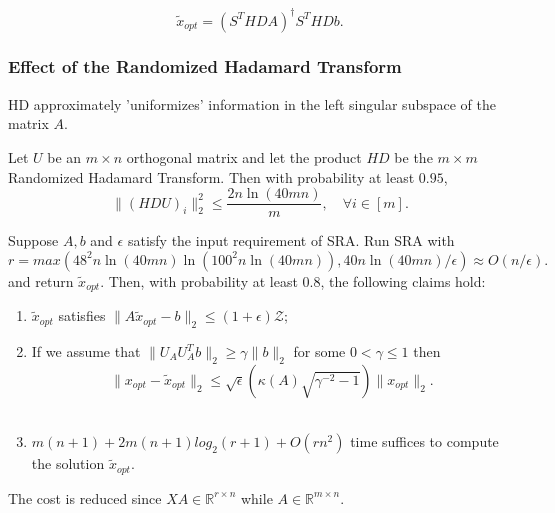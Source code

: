 $$
\tilde{x}_{opt} = (S^T H D A)^{\dagger} S^T H D b.
$$

\subsubsection{Effect of the Randomized Hadamard Transform}
{\color{red} HD approximately 'uniformizes' information in the left singular subspace of the matrix $A$.}
\begin{lemma}
Let $U$ be an $m \times n$ orthogonal matrix and let the product $HD$ be the $m \times m$ Randomized Hadamard Transform. Then with probability at least $0.95$,
$$
\| (HDU)_{i} \|_2^2 \leq \frac{2n \ln(40 m n)}{m}, \quad \forall i \in [m].
$$
\end{lemma}



\begin{theorem}
Suppose $A,b$ and $\epsilon$ satisfy the input requirement of SRA. Run SRA with
\begin{equation}\label{eq22}
r = max \left( 48^2 n \ln(40 mn) \ln(100^2 n \ln(40 mn)) , 40n \ln(40 mn) /\epsilon \right)
\approx O(n/\epsilon).
\end{equation}
and return $\tilde{x}_{opt}.$ Then, with probability at least $0.8$, the following claims hold:
\begin{enumerate}
\item $\tilde{x}_{opt}$ satisfies $\| A \tilde{x}_{opt} - b \|_2  \leq (1 + \epsilon) \mathcal{Z}; $ \\
\item If we assume that $\| U_A  U_A^T b \|_2 \geq \gamma \|b\|_2 $ for some $0< \gamma \leq 1$ then
$$
\| x_{opt} - \tilde{x}_{opt}\|_2 \leq \sqrt{\epsilon} \left( \kappa(A) \sqrt{\gamma^{-2} -1} \right) \| x_{opt}\|_2.
$$\\
\item $m(n+1) + 2m(n+1)log_2(r+1) + O(rn^2)$ time suffices to compute the solution $\tilde{x}_{opt}. $
\end{enumerate}
\end{theorem}
The cost is reduced since $XA \in \mathbb{R}^{r \times n}$ while $A \in \mathbb{R}^{m \times n}.$


